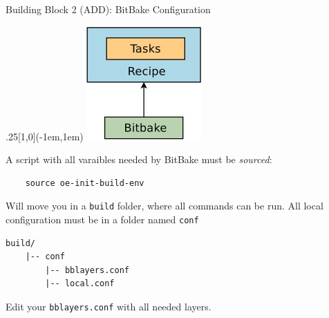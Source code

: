 \documentclass[ucs,9pt]{beamer}
\begin{document}
\begin{frame}[fragile]
    {Building Block 2 (ADD): BitBake Configuration}

    \begin{textblock*}{.25\paperwidth}[1,0](\paperwidth-1em,1em)%
        \includegraphics[width=\linewidth]{images/bitbake-definition}
    \end{textblock*}%

    A script with all varaibles needed by BitBake must be \emph{sourced}:
\begin{verbatim}
    source oe-init-build-env
\end{verbatim}

    Will move you in a \texttt{build} folder, where all commands can be run.
    All local configuration must be in a folder named \texttt{conf}
\begin{verbatim}
build/
    |-- conf
        |-- bblayers.conf
        |-- local.conf
\end{verbatim}

    Edit your \texttt{bblayers.conf} with all needed layers.
\end{frame}
\end{document}
